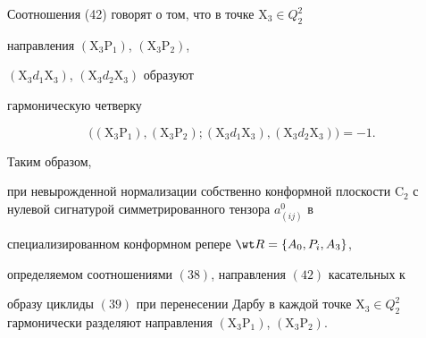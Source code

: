  


Соотношения (42) говорят о том, что в точке $\mathrm X_3\in Q^2_2$ 


направления $(\mathrm X_3\mathrm P_1)$, $(\mathrm X_3\mathrm P_2)$, 


$(\mathrm X_3d_1\mathrm X_3)$, $(\mathrm X_3d_2\mathrm X_3)$ образуют 


гармоническую четверку 


$$ 


\big((\mathrm X_3\mathrm P_1), (\mathrm X_3\mathrm P_2); 


(\mathrm X_3d_1\mathrm X_3),(\mathrm X_3d_2\mathrm X_3)\big)=-1. 


$$ 


 


Таким образом, {\it 


при невырожденной нормализации собственно конформной плоскости $\mathrm 


C_2$ с нулевой сигнатурой симметрированного тензора $a^0_{(i j)}$ в 


специализированном конформном репере $\wt R=\{A_0,P_i,A_3\}$, 


определяемом соотношениями $(38)$, направления $(42)$ касательных к 


образу циклиды $(39)$ при перенесении Дарбу в каждой точке $\mathrm 


X_3\in Q^2_2$ гармонически разделяют направления $(\mathrm X_3\mathrm 


P_1)$, $(\mathrm X_3\mathrm P_2)$. 


} 


 


 


